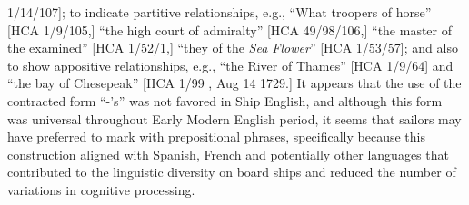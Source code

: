 1/14/107]; to indicate partitive relationships, e.g., “What troopers of horse” [HCA 1/9/105,] “the high court of admiralty” [HCA 49/98/106,] “the master of the examined” [HCA 1/52/1,] “they of the \textit{Sea Flower}” [HCA 1/53/57]; and also to show appositive relationships, e.g., “the River of Thames” [HCA 1/9/64] and “the bay of Chesepeak” [HCA 1/99 , Aug 14 1729.] It appears that the use of the contracted form “-’s” was not favored in Ship English, and although this form was universal throughout Early Modern English period, it seems that sailors may have preferred to mark  with prepositional phrases, specifically because this construction aligned with Spanish, French and potentially other languages that contributed to the linguistic diversity on board ships and reduced the number of variations in cognitive processing.

